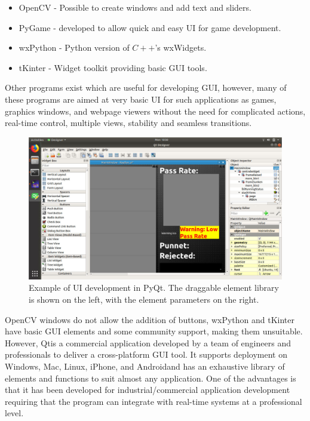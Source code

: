\documentclass[fleqn,twoside,12pt]{report}
\begin{document}
\begin{itemize}
	\item OpenCV - Possible to create windows and add text and sliders.
	\item PyGame - developed to allow quick and easy UI for game development.
	\item wxPython - Python version of $C++$'s wxWidgets.
	\item tKinter - Widget toolkit providing basic GUI tools.
\end{itemize}

Other programs exist which are useful for developing GUI, however, many of these programs are aimed at very basic UI for such applications as games, graphics windows, and webpage viewers without the need for complicated actions, real-time control, multiple views, stability and seamless transitions.



\begin{figure}[h]
	\centering
	\includegraphics[width=.8\linewidth]{qt.png}
	\caption{Example of UI development in PyQt\textregistered. The draggable element library is shown on the left, with the element parameters on the right.}
	\label{fig:qt}
\end{figure}%


OpenCV windows do not allow the addition of buttons, wxPython and tKinter have basic GUI elements and some community support, making them unsuitable. However, Qt\textregistered is a commercial application developed by a team of engineers and professionals to deliver a cross-platform GUI tool. It supports deployment on Windows\textregistered, Mac\textregistered, Linux\textregistered, iPhone\textregistered, and Android\textregistered and has an exhaustive library of elements and functions to suit almost any application. One of the advantages is that it has been developed for industrial/commercial application development requiring that the program can integrate with real-time systems at a professional level.
\end{document}
